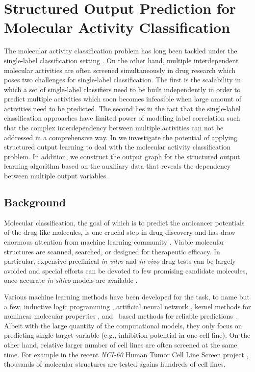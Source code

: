 {%
%
\section{Structured Output Prediction for Molecular Activity Classification} \label{sc_su10}

The molecular activity classification problem has long been tackled under the single-label classification setting \citep{Menchetti05weighted,Singh12qsar,Dutt12classification}.
On the other hand, multiple interdependent molecular activities are often screened simultaneously in drug research \citep{Shoemaker06the} which poses two challenges for single-label classification.
The first is the scalability in which a set of single-label classifiers need to be built independently in order to predict multiple activities which soon becomes infeasible when large amount of activities need to be predicted.
The second lies in the fact that the single-label classification approaches have limited power of modeling label correlation such that the complex interdependency between multiple activities can not be addressed in a comprehensive way.
In  we investigate the potential of applying structured output learning to deal with the molecular activity classification problem.
In addition, we construct the output graph for the structured output learning algorithm based on the auxiliary data that reveals the dependency between multiple output variables.



%
%
\subsection{Background}

Molecular classification, the goal of which is to predict the anticancer potentials of the drug-like molecules, is one crucial step in drug discovery and has draw enormous attention from machine learning community \citep{Singh12qsar,Dutt12classification}.
Viable molecular structures are scanned, searched, or designed for therapeutic efficacy.
In particular, expensive preclinical \textit{in vitro} and \textit{in vivo} drug tests can be largely avoided and special efforts can be devoted to few promising candidate molecules, once accurate \textit{in silico} models are available \citep{Burbidg01drug}.

Various machine learning methods have been developed for the task, to name but a few, inductive logic programming \citep{King96structure}, artificial neural network \citep{Bernazzani06predicting}, kernel methods for nonlinear molecular properties \citep{Trotter01drug,Ralaivola05graph,Swamidass05kernel,Ceroni07classification}, and \svm\ based methods for reliable predictions \citep{Trotter01drug,Byvatov03comparison,Xue04effect}.
Albeit with the large quantity of the computational models, they only focus on predicting single target variable (e.g., inhibition potential in one cell line). 
On the other hand, relative larger number of cell lines are often screened at the same time.
For example in the recent \textit{NCI-60} {Human Tumor Cell Line Screen} project \citep{Shoemaker06the}, thousands of molecular structures are tested agains hundreds of cell lines.



}
